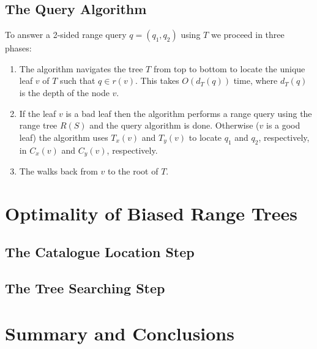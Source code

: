 \documentclass[lotsofwhite,charterfonts]{patmorin}
\begin{document}
\subsection{The Query Algorithm}

To answer a 2-sided range query $q=(q_1,q_2)$ using $T$ we proceed in
three phases:

\begin{enumerate}

\item The algorithm navigates the tree $T$ from top to bottom to
locate the unique leaf $v$ of $T$ such that $q\in r(v)$.  This takes
$O(d_T(q))$ time, where $d_T(q)$ is the depth of the node $v$.


\item If the leaf $v$ is a bad leaf then the algorithm performs a
range query using the range tree $R(S)$ and the query algorithm is
done.  Otherwise ($v$ is a good leaf) the algorithm uses $T_x(v)$ and
$T_y(v)$ to locate $q_1$ and $q_2$, respectively, in $C_x(v)$ and
$C_y(v)$, respectively.

\item The walks back from $v$ to the root of $T$.

\end{enumerate}

\section{Optimality of Biased Range Trees}

\subsection{The Catalogue Location Step}


\subsection{The Tree Searching Step}

\section{Summary and Conclusions}
\end{document}

